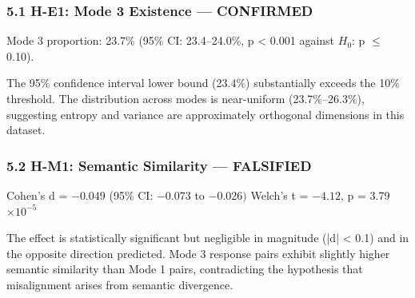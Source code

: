 
\subsubsection{5.1 H-E1: Mode 3 Existence --- CONFIRMED}

\begin{table}[htbp]
\centering
{}
\end{table}

Mode 3 proportion: 23.7\% (95\% CI: 23.4--24.0\%, p < 0.001 against $H_0$: p $\leq$ 0.10).

The 95\% confidence interval lower bound (23.4\%) substantially exceeds the 10\% threshold. The distribution across modes is near-uniform (23.7\%--26.3\%), suggesting entropy and variance are approximately orthogonal dimensions in this dataset.

\subsubsection{5.2 H-M1: Semantic Similarity --- FALSIFIED}

\begin{table}[htbp]
\centering
{}
\end{table}

Cohen's d = $-0.049$ (95\% CI: $-0.073$ to $-0.026)$
Welch's t = $-4.12$, p = 3.79 $\times 10^{-5}$

The effect is statistically significant but negligible in magnitude (|d| < 0.1) and in the opposite direction predicted. Mode 3 response pairs exhibit slightly higher semantic similarity than Mode 1 pairs, contradicting the hypothesis that misalignment arises from semantic divergence.

